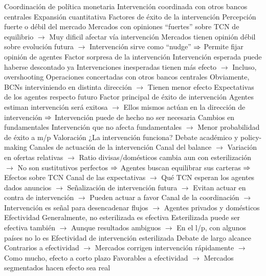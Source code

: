 \documentclass{nuevotema}
\begin{document}
\begin{esquemal}
				\4 Coordinación de política monetaria
				\4[] Intervención coordinada con otros bancos centrales
				\4 Expansión cuantitativa
			\3 Factores de éxito de la intervención
				\4[i] Percepción fuerte o débil del mercado
				\4[] Mercados con opiniones ``fuertes'' sobre TCN de equilibrio
				\4[] $\to$ Muy dificil afectar vía intervención
				\4[] Mercados tienen opinión débil sobre evolución futura
				\4[] $\to$ Intervención sirve como ``nudge''
				\4[] $\Rightarrow$ Permite fijar opinión de agentes
				\4[ii] Factor sorpresa de la intervención
				\4[] Intervención esperada puede haberse descontado ya
				\4[] Intervenciones inesperadas tienen más efecto
				\4[] $\to$ Incluso, overshooting
				\4[iii] Operaciones concertadas con otros bancos centrales
				\4[] Obviamente, BCNs interviniendo en distinta dirección
				\4[] $\to$ Tienen menor efecto
				\4[iv] Expectativas de los agentes respecto futuro
				\4[] Factor principal de éxito de intervención
				\4[] Agentes estiman intervención será exitosa
				\4[] $\to$ Ellos mismos actúan en la dirección de intervención
				\4[] $\Rightarrow$ Intervención puede de hecho no ser necesaria
				\4[v] Cambios en fundamentales
				\4[] Intervención que no afecta fundamentales
				\4[] $\to$ Menor probabilidad de éxito a m/p
			\3 Valoración
				\4 ¿La intervención funciona?
				\4[] Debate académico y policy-making
				\4 Canales de actuación de la intervención
				\4[] Canal del balance
				\4[] $\to$ Variación en ofertas relativas
				\4[] $\to$ Ratio divisas/domésticos cambia aun con esterilización
				\4[] $\to$ No son sustitutivos perfectos
				\4[] $\Rightarrow$ Agentes buscan equilibrar sus carteras
				\4[] $\Rightarrow$ Efectos sobre TCN
				\4[] Canal de las expectativas
				\4[] $\to$ Qué TCN esperan los agentes dados anuncios
				\4[] $\to$ Señalización de intervención futura
				\4[] $\to$ Evitan actuar en contra de intervención
				\4[] $\to$ Pueden actuar a favor
				\4[] Canal de la coordinación
				\4[] $\to$ Intervención es señal para desencadenar flujos
				\4[] $\to$ Agentes privados y domésticos
				\4 Efectividad
				\4[] Generalmente, no esterilizada es efectiva
				\4[] Esterilizada puede ser efectiva también
				\4[] $\to$ Aunque resultados ambiguos
				\4[] $\to$ En el l/p, con algunos países no lo es
				\4 Efectividad de intervención esterilizada
				\4[] Debate de largo alcance
				\4[] Contrarios a efectividad
				\4[] $\to$ Mercados corrigen intervención rápidamente
				\4[] $\to$ Como mucho, efecto a corto plazo
				\4[] Favorables a efectividad
				\4[] $\to$ Mercados segmentados hacen efecto sea real

\end{esquemal}
\end{document}
